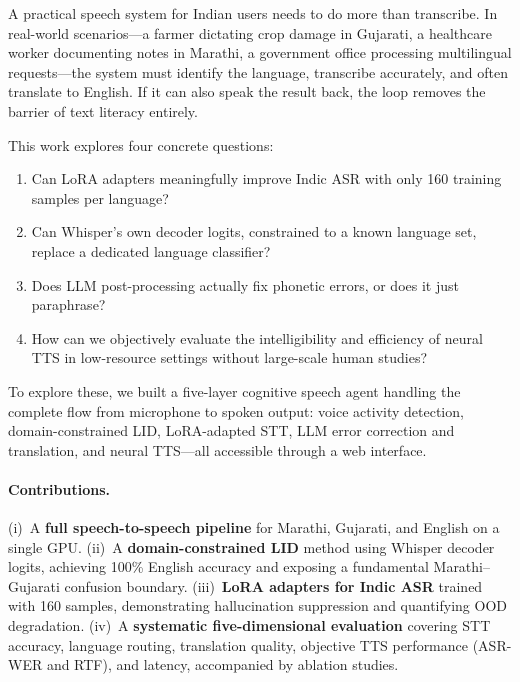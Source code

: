 \documentclass[11pt]{article}
\begin{document}
A practical speech system for Indian users needs to do more than transcribe.  In real-world scenarios---a farmer dictating crop damage in Gujarati, a healthcare worker documenting notes in Marathi, a government office processing multilingual requests---the system must identify the language, transcribe accurately, and often translate to English. If it can also speak the result back, the loop removes the barrier of text literacy entirely.

This work explores four concrete questions:

\begin{enumerate}\itemsep0pt
    \item Can LoRA adapters \citep{hu2022lora} meaningfully improve Indic ASR with only 160 training samples per language?
    \item Can Whisper's own decoder logits, constrained to a known language set, replace a dedicated language classifier?
    \item Does LLM post-processing actually fix phonetic errors, or does it just paraphrase?
    \item How can we objectively evaluate the intelligibility and efficiency of neural TTS in low-resource settings without large-scale human studies?
\end{enumerate}

To explore these, we built a five-layer cognitive speech agent handling the complete flow from microphone to spoken output: voice activity detection, domain-constrained LID, LoRA-adapted STT, LLM error correction and translation, and neural TTS---all accessible through a web interface.

\paragraph{Contributions.}  (i)~A \textbf{full speech-to-speech pipeline} for Marathi, Gujarati, and English on a single GPU.  (ii)~A \textbf{domain-constrained LID} method using Whisper decoder logits, achieving 100\% English accuracy and exposing a fundamental Marathi--Gujarati confusion boundary.  (iii)~\textbf{LoRA adapters for Indic ASR} trained with 160 samples, demonstrating hallucination suppression and quantifying OOD degradation.  (iv)~A \textbf{systematic five-dimensional evaluation} covering STT accuracy, language routing, translation quality, objective TTS performance (ASR-WER and RTF), and latency, accompanied by ablation studies.

\end{document}
